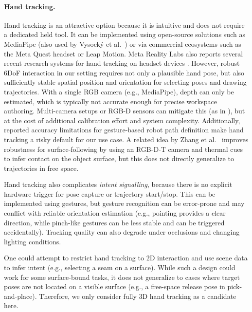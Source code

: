\paragraph{Hand tracking.}
Hand tracking is an attractive option because it is intuitive and does not require a dedicated held tool. It can be implemented using open-source solutions such as MediaPipe \cite{MediaPipeRoot} (also used by Vysocký et al.\ \cite{Vysocky2023}) or via commercial ecosystems such as the Meta Quest headset or Leap Motion. Meta Reality Labs also reports several recent research systems for hand tracking on headset devices \cite{FB_research, FB__UmeTrack, FB__MEgATrack, FB__ElasticHandTrack}.
However, robust 6DoF interaction in our setting requires not only a plausible hand pose, but also sufficiently stable spatial position and orientation for selecting poses and drawing trajectories. With a single RGB camera (e.g., MediaPipe), depth can only be estimated, which is typically not accurate enough for precise workspace authoring. Multi-camera setups or RGB-D sensors can mitigate this (as in \cite{Vysocky2023}), but at the cost of additional calibration effort and system complexity. Additionally, reported accuracy limitations for gesture-based robot path definition \cite{Vysocky2023} make hand tracking a risky default for our use case.
A related idea by Zhang et al.\ \cite{Zhang2023} improves robustness for surface-following by using an RGB-D-T camera and thermal cues to infer contact on the object surface, but this does not directly generalize to trajectories in free space.

Hand tracking also complicates \emph{intent signalling}, because there is no explicit hardware trigger for pose capture or trajectory start/stop. This can be implemented using gestures, but gesture recognition can be error-prone and may conflict with reliable orientation estimation (e.g., pointing provides a clear direction, while pinch-like gestures can be less stable and can be triggered accidentally). Tracking quality can also degrade under occlusions and changing lighting conditions.

One could attempt to restrict hand tracking to 2D interaction and use scene data to infer intent (e.g., selecting a seam on a surface). While such a design could work for some surface-bound tasks, it does not generalize to cases where target poses are not located on a visible surface (e.g., a free-space release pose in pick-and-place). Therefore, we only consider fully 3D hand tracking as a candidate here.


